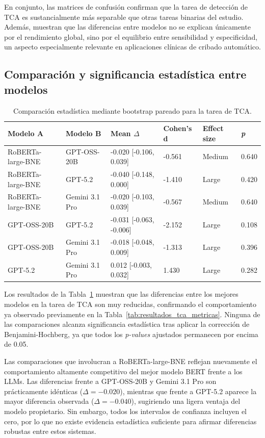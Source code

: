 En conjunto, las matrices de confusión confirman que la tarea de detección de TCA es sustancialmente más separable que otras tareas binarias del estudio. Además, muestran que las diferencias entre modelos no se explican únicamente por el rendimiento global, sino por el equilibrio entre sensibilidad y especificidad, un aspecto especialmente relevante en aplicaciones clínicas de cribado automático.

\subsection{Comparación y significancia estadística entre modelos}

\begin{table}[H]
	\centering
	\small
	\begin{tabular}{llllll}
		\hline
		\textbf{Modelo A} & \textbf{Modelo B} & \textbf{Mean $\Delta$} & \textbf{Cohen's d} & \textbf{Effect size} & \textbf{\textit{p}} \\
		\hline
		RoBERTa-large-BNE & GPT-OSS-20B & -0.020 [-0.106, 0.039] & -0.561 & Medium & 0.640 \\
		RoBERTa-large-BNE & GPT-5.2 & -0.040 [-0.148, 0.000] & -1.410 & Large & 0.420 \\
		RoBERTa-large-BNE & Gemini 3.1 Pro & -0.020 [-0.103, 0.039] & -0.567 & Medium & 0.640 \\
		GPT-OSS-20B & GPT-5.2 & -0.031 [-0.063, -0.006] & -2.152 & Large & 0.108 \\
		GPT-OSS-20B & Gemini 3.1 Pro & -0.018 [-0.048, 0.009] & -1.313 & Large & 0.396 \\
		GPT-5.2 & Gemini 3.1 Pro & 0.012 [-0.003, 0.032] & 1.430 & Large & 0.282 \\
		\hline
	\end{tabular}
	\caption{Comparación estadística mediante bootstrap pareado para la tarea de TCA.}
	\label{tab:bootstrap_tca}
\end{table}

Los resultados de la Tabla~\ref{tab:bootstrap_tca} muestran que las diferencias entre los mejores modelos en la tarea de \ac{TCA} son muy reducidas, confirmando el comportamiento ya observado previamente en la Tabla~\ref{tab:resultados_tca_metricas}. Ninguna de las comparaciones alcanza significancia estadística tras aplicar la corrección de Benjamini-Hochberg, ya que todos los \textit{p-values} ajustados permanecen por encima de 0.05.

Las comparaciones que involucran a RoBERTa-large-BNE reflejan nuevamente el comportamiento altamente competitivo del mejor modelo BERT frente a los \acp{LLM}. Las diferencias frente a GPT-OSS-20B y Gemini 3.1 Pro son prácticamente idénticas (\(\Delta = -0.020\)), mientras que frente a GPT-5.2 aparece la mayor diferencia observada (\(\Delta = -0.040\)), sugiriendo una ligera ventaja del modelo propietario. Sin embargo, todos los intervalos de confianza incluyen el cero, por lo que no existe evidencia estadística suficiente para afirmar diferencias robustas entre estos sistemas.

